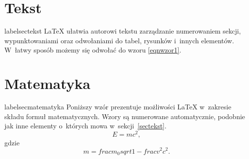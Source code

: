 \section{Tekst}label{sectekst}
LaTeX ułatwia autorowi tekstu zarządzanie 
numerowaniem sekcji, wypunktowaniami oraz odwołaniami 
do tabel, rysunków i~innych elementów. W~łatwy sposób 
możemy się odwołać do wzoru \ref{eqnwzor1}.

\section{Matematyka}label{secmatematyka}
Poniższy wzór prezentuje możliwości LaTeX w~zakresie 
składu formuł matematycznych. Wzory są numerowane 
automatycznie, podobnie jak inne elementy o~których 
mowa w~sekcji~\ref{sectekst}.
\begin{equation}
E = mc^2,
\label{eqnwzor1}
\end{equation}
gdzie
\begin{equation}
m = frac{m_0}{sqrt{1-frac{v^2}{c^2}}}.
\end{equation}
